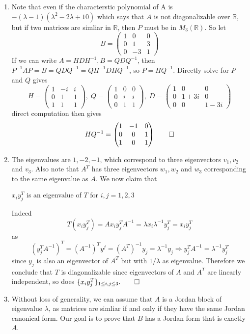 \begin{enumerate}
    \item Note that even if the characterstic polynomial of A is $-(\lambda-1)(\lambda^2 - 2\lambda+10)$ which says that $A$ is not diagonalizable over $\mathbb{R}$, but if two matrices are simliar in $\mathbb{R}$, then $P$ must be in $M_3(\mathbb{R})$. So let 
    \[
    B = \begin{pmatrix}
        1 & 0 & 0 \\
        0 & 1 & 3 \\
        0 & -3 & 1
    \end{pmatrix}
    \]
    If we can write $A = HDH^{-1}, B = QDQ^{-1}$, then $P^{-1}AP = B = QDQ^{-1} = QH^{-1}DHQ^{-1}$, so $P = HQ^{-1}$. Directly solve for $P$ and $Q$ gives 
    \[
    H = \begin{pmatrix}
        1 & -i & i\\
        0 & 1 & 1\\
        1 & 1 & 1
    \end{pmatrix}, \;
    Q = \begin{pmatrix}
        1 & 0 & 0 \\
        0 & i & i \\
        0 & 1 & 1
    \end{pmatrix}, \;
    D = \begin{pmatrix}
        1 & 0 & 0 \\
        0 & 1+3i & 0 \\
        0 & 0 & 1-3i
    \end{pmatrix}
    \]
    direct computation then gives
    \[
    HQ^{-1} = \begin{pmatrix}
        1 & -1 & 0 \\
        0 & 0 & 1\\
        1 & 0 & 1
    \end{pmatrix}
    \qed	
    \]
    \item The eigenvalues are $1,-2,-1$, which correspond to three eigenvectors $v_1,v_2$ and $v_3$. Also note that $A^T$ has three eigenvectors $w_1, w_2$ and $w_3$ corresponding to the same eigenvalue as $A$. We now claim that 
    \begin{center}
        $x_iy_j^T$ is an eigenvalue of $T$ for $i,j = 1,2,3$
    \end{center} 
    Indeed
    \[
    T(x_iy_j^T) = Ax_i y_j^T A^{-1} = \lambda x_i \lambda^{-1} y_j^T = x_iy_j^T
    \]
    as 
    \[
    (y_j^T A^{-1})^T = (A^{-1})^T y^j = (A^T)^{-1} y_j = \lambda^{-1}y_j \Rightarrow y_j^T A^{-1} = \lambda^{-1}y_j^T
    \]
    since $y_j$ is also an eigenvector of $A^T$ but with $1/\lambda$ as eigenvalue. Therefore we conclude that $T$ is diagonalizable since eigenvectors of $A$ and $A^T$ are linearly independent, so does $\{x_iy_j^T\}_{1 \leq i,j \leq 3}. \qed$
    \item Without loss of generality, we can assume that $A$ is a Jordan block of eigenvalue $\lambda$, as matrices are simliar if and only if they have the same Jordan canonical form. Our goal is to prove that $B$ has a Jordan form that is exactly $A$. 
    

\end{enumerate}
